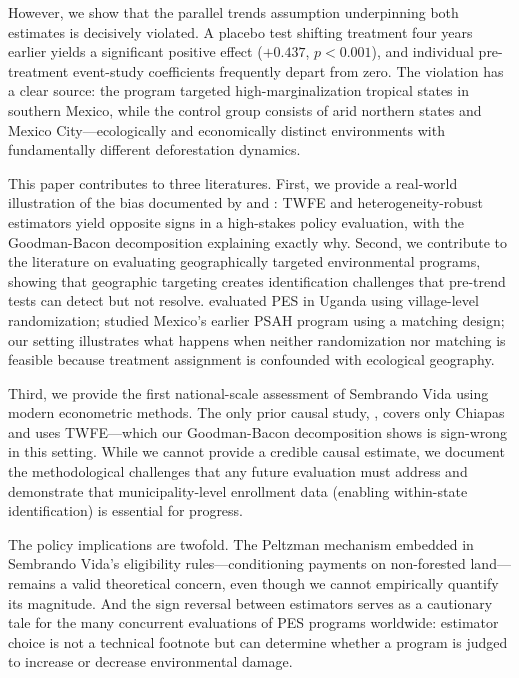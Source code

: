 \documentclass[12pt]{article}
\begin{document}
However, we show that the parallel trends assumption underpinning both estimates is decisively violated. A placebo test shifting treatment four years earlier yields a significant positive effect ($+0.437$, $p < 0.001$), and individual pre-treatment event-study coefficients frequently depart from zero. The violation has a clear source: the program targeted high-marginalization tropical states in southern Mexico, while the control group consists of arid northern states and Mexico City---ecologically and economically distinct environments with fundamentally different deforestation dynamics.

This paper contributes to three literatures. First, we provide a real-world illustration of the bias documented by \citet{goodmanbacon2021difference} and \citet{dechaisemartin2020two}: TWFE and heterogeneity-robust estimators yield opposite signs in a high-stakes policy evaluation, with the Goodman-Bacon decomposition explaining exactly why. Second, we contribute to the literature on evaluating geographically targeted environmental programs, showing that geographic targeting creates identification challenges that pre-trend tests can detect but not resolve. \citet{jayachandran2017cash} evaluated PES in Uganda using village-level randomization; \citet{alix2012deforestation} studied Mexico's earlier PSAH program using a matching design; our setting illustrates what happens when neither randomization nor matching is feasible because treatment assignment is confounded with ecological geography.

Third, we provide the first national-scale assessment of Sembrando Vida using modern econometric methods. The only prior causal study, \citet{perezponciano2025deforestation}, covers only Chiapas and uses TWFE---which our Goodman-Bacon decomposition shows is sign-wrong in this setting. While we cannot provide a credible causal estimate, we document the methodological challenges that any future evaluation must address and demonstrate that municipality-level enrollment data (enabling within-state identification) is essential for progress.

The policy implications are twofold. The Peltzman mechanism embedded in Sembrando Vida's eligibility rules---conditioning payments on non-forested land---remains a valid theoretical concern, even though we cannot empirically quantify its magnitude. And the sign reversal between estimators serves as a cautionary tale for the many concurrent evaluations of PES programs worldwide: estimator choice is not a technical footnote but can determine whether a program is judged to increase or decrease environmental damage.
\end{document}

